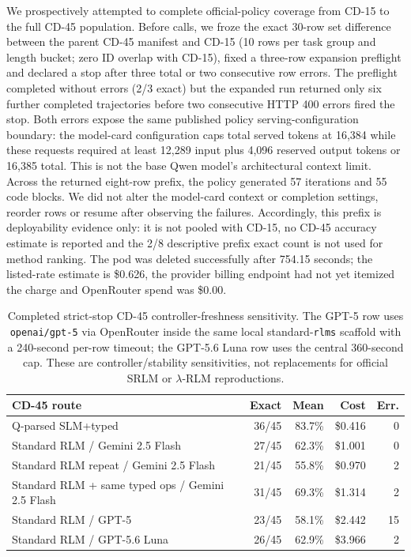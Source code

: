 \documentclass[letterpaper]{article}
\begin{document}
We prospectively attempted to complete official-policy coverage from CD-15 to the full CD-45 population. Before calls, we froze the exact 30-row set difference between the parent CD-45 manifest and CD-15 (10 rows per task group and length bucket; zero ID overlap with CD-15), fixed a three-row expansion preflight and declared a stop after three total or two consecutive row errors. The preflight completed without errors (2/3 exact) but the expanded run returned only six further completed trajectories before two consecutive HTTP 400 errors fired the stop. Both errors expose the same published policy serving-configuration boundary: the model-card configuration caps total served tokens at 16,384 while these requests required at least 12,289 input plus 4,096 reserved output tokens or 16,385 total. This is not the base Qwen model's architectural context limit. Across the returned eight-row prefix, the policy generated 57 iterations and 55 code blocks. We did not alter the model-card context or completion settings, reorder rows or resume after observing the failures. Accordingly, this prefix is deployability evidence only: it is not pooled with CD-15, no CD-45 accuracy estimate is reported and the 2/8 descriptive prefix exact count is not used for method ranking. The pod was deleted successfully after 754.15 seconds; the listed-rate estimate is \$0.626, the provider billing endpoint had not yet itemized the charge and OpenRouter spend was \$0.00.

\begin{table}[!t]
\centering
\small
\setlength{\tabcolsep}{3pt}
\begin{tabular}{@{}p{5.0cm}rrrr@{}}
\toprule
\textbf{CD-45 route} & \textbf{Exact} & \textbf{Mean} & \textbf{Cost} & \textbf{Err.} \\
\midrule
Q-parsed SLM+typed & 36/45 & 83.7\% & \$0.416 & 0 \\
Standard RLM / Gemini 2.5 Flash & 27/45 & 62.3\% & \$1.001 & 0 \\
Standard RLM repeat / Gemini 2.5 Flash & 21/45 & 55.8\% & \$0.970 & 2 \\
Standard RLM + same typed ops / Gemini 2.5 Flash & 31/45 & 69.3\% & \$1.314 & 2 \\
Standard RLM / GPT-5 & 23/45 & 58.1\% & \$2.442 & 15 \\
Standard RLM / GPT-5.6 Luna & 26/45 & 62.9\% & \$3.966 & 2 \\
\bottomrule
\end{tabular}
\caption{Completed strict-stop CD-45 controller-freshness sensitivity. The GPT-5 row uses \texttt{openai/gpt-5} via OpenRouter inside the same local standard-\texttt{rlms} scaffold with a 240-second per-row timeout; the GPT-5.6 Luna row uses the central 360-second cap. These are controller/stability sensitivities, not replacements for official SRLM or $\lambda$-RLM reproductions.}
\label{tab:supp-oolong-cd45-gpt5-freshness}
\end{table}
\end{document}
